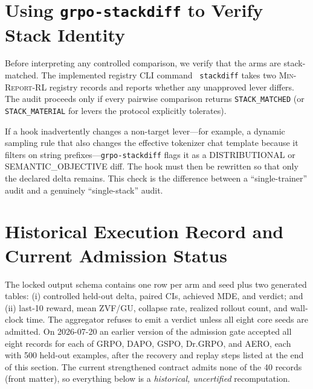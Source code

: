 \documentclass[11pt]{article}
\newcommand{\zvf}{\textnormal{ZVF}}
\newcommand{\gu}{\textnormal{GU}}
\newcommand{\minreport}{\textsc{Min-Report-RL}}
\newcommand{\grpo}{\textsc{GRPO}}
\begin{document}
\section{Using \texttt{grpo-stackdiff} to Verify Stack Identity}
\label{sec:stackdiff}

Before interpreting any controlled comparison, we verify that the arms are
stack-matched. The implemented registry CLI command
~\texttt{stackdiff} \cite{minreportrl2026}
takes two \minreport{} registry records and reports
whether any unapproved lever differs. The audit proceeds only if every pairwise
comparison returns \texttt{STACK\_MATCHED} (or \texttt{STACK\_MATERIAL} for
levers the protocol explicitly tolerates).

\begin{sloppypar}
If a hook inadvertently changes a non-target lever---for example, a dynamic
sampling rule that also changes the effective tokenizer chat template because
it filters on string prefixes---\texttt{grpo-stackdiff} flags it as a
DISTRIBUTIONAL or SEMANTIC\_OBJECTIVE diff. The hook must then be rewritten so
that only the declared delta remains. This check is the difference between a
``single-trainer'' audit and a genuinely ``single-stack'' audit.
\end{sloppypar}

\section{Historical Execution Record and Current Admission Status}
\label{sec:execution}

The locked output schema contains one row per arm and seed plus two generated
tables: (i) controlled held-out delta, paired CIs, achieved MDE, and verdict;
and (ii) last-10 reward, mean \zvf/\gu{}, collapse rate, realized rollout count,
and wall-clock time. The aggregator refuses to emit a verdict unless all eight
core seeds are admitted. On 2026-07-20 an earlier version of the admission gate
accepted all eight records for each of GRPO, DAPO, GSPO, Dr.\grpo{}, and AERO,
each with 500 held-out examples, after the recovery and replay steps listed at
the end of this section. The current strengthened contract admits none of the
40 records (front matter), so everything below is a \emph{historical,
uncertified} recomputation.
\end{document}
